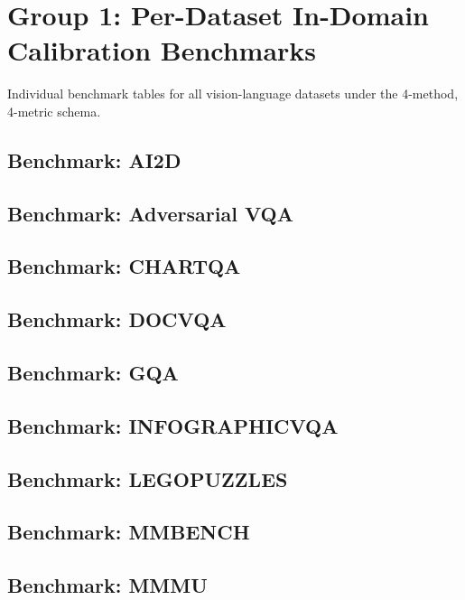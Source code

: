 \documentclass[11pt,a4paper]{article}
\begin{document}
\section{Group 1: Per-Dataset In-Domain Calibration Benchmarks}
Individual benchmark tables for all vision-language datasets under the 4-method, 4-metric schema.
\subsection{Benchmark: AI2D}

\clearpage
\subsection{Benchmark: Adversarial VQA}

\clearpage
\subsection{Benchmark: CHARTQA}

\clearpage
\subsection{Benchmark: DOCVQA}

\clearpage
\subsection{Benchmark: GQA}

\clearpage
\subsection{Benchmark: INFOGRAPHICVQA}

\clearpage
\subsection{Benchmark: LEGOPUZZLES}

\clearpage
\subsection{Benchmark: MMBENCH}

\clearpage
\subsection{Benchmark: MMMU}

\clearpage
\end{document}
